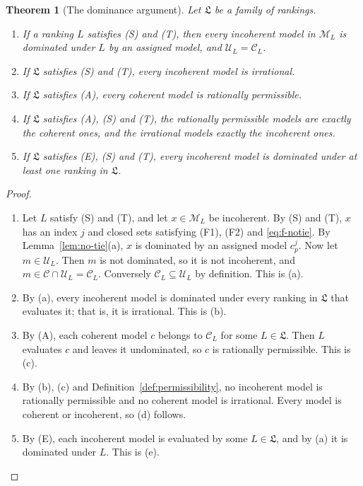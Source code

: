 \documentclass[11pt]{article}
\newtheorem{theorem}{Theorem}[section]
\theoremstyle{definition}
\theoremstyle{remark}
\newcommand{\M}{\mathcal M}
\newcommand{\C}{\mathcal C}
\newcommand{\U}{\mathcal U}
\newcommand{\Lf}{\mathfrak L}
\begin{document}
\begin{theorem}[The dominance argument]\label{thm:argument}
Let $\Lf$ be a family of rankings.
\begin{enumerate}[label=(\alph*)]
\item If a ranking $L$ satisfies {(S)} and {(T)}, then every incoherent model in $\M_L$ is dominated under $L$ by an assigned model, and $\U_L=\C_L$.
\item If $\Lf$ satisfies {(S)} and {(T)}, every incoherent model is irrational.
\item If $\Lf$ satisfies (A), every coherent model is rationally permissible.
\item If $\Lf$ satisfies (A), {(S)} and {(T)}, the rationally permissible models are exactly the coherent ones, and the irrational models exactly the incoherent ones.
\item If $\Lf$ satisfies (E), {(S)} and {(T)}, every incoherent model is dominated under at least one ranking in $\Lf$.
\end{enumerate}
\end{theorem}
\begin{proof}
\leavevmode
\begin{enumerate}[label=\arabic*.,leftmargin=*]
\item Let $L$ satisfy {(S)} and {(T)}, and let $x\in\M_L$ be incoherent. {By (S) and (T), $x$ has an index $j$ and closed sets satisfying (F1), (F2) and \eqref{eq:f-notie}. By Lemma~\ref{lem:no-tie}(a), $x$ is dominated by an assigned model $c^j_p$.} Now let $m\in\U_L$. Then $m$ is not dominated, so it is not incoherent, and $m\in\C\cap\U_L=\C_L$. Conversely $\C_L\subseteq\U_L$ by definition. This is (a).
\item By (a), every incoherent model is dominated under every ranking in $\Lf$ that evaluates it; that is, it is irrational. This is (b).
\item By (A), each coherent model $c$ belongs to $\C_L$ for some $L\in\Lf$. Then $L$ evaluates $c$ and leaves it undominated, so $c$ is rationally permissible. This is (c).
\item By (b), (c) and Definition~\ref{def:permissibility}, no incoherent model is rationally permissible and no coherent model is irrational. Every model is coherent or incoherent, so (d) follows.
\item By (E), each incoherent model is evaluated by some $L\in\Lf$, and by (a) it is dominated under $L$. This is (e).\qedhere
\end{enumerate}
\end{proof}
\end{document}
